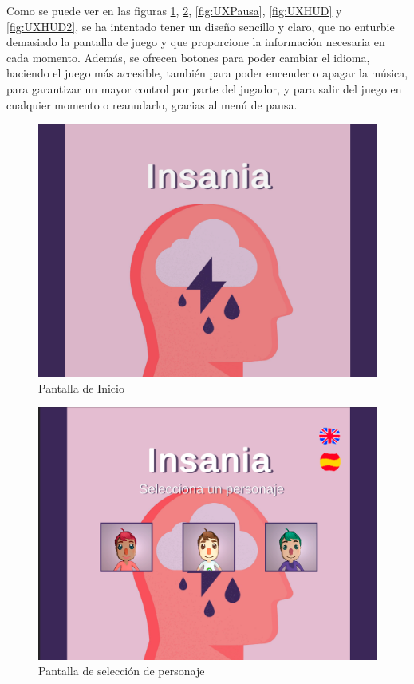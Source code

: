 \documentclass[12pt, a4paper,twoside,titlepage]{book}
\begin{document}
Como se puede ver en las figuras \ref{fig:UXInicio}, \ref{fig:UXSelec}, \ref{fig:UXPausa}, \ref{fig:UXHUD} y \ref{fig:UXHUD2}, se ha intentado tener un diseño sencillo y claro, que no enturbie demasiado la pantalla de juego y que proporcione la información necesaria en cada momento. Además, se ofrecen botones para poder cambiar el idioma, haciendo el juego más accesible, también para poder encender o apagar la música, para garantizar un mayor control por parte del jugador, y para salir del juego en cualquier momento o reanudarlo, gracias al menú de pausa. 



\begin{figure}
	\centering
	\includegraphics[width=.8\linewidth]{TGF/Artes/Portada.png}
	\caption{Pantalla de Inicio}
	\label{fig:UXInicio}
\end{figure}

\begin{figure}
	\centering
	\includegraphics[width=.8\linewidth]{TGF/Artes/Personajes.png}
	\caption{Pantalla de selección de personaje}
	\label{fig:UXSelec}
\end{figure}
\end{document}
